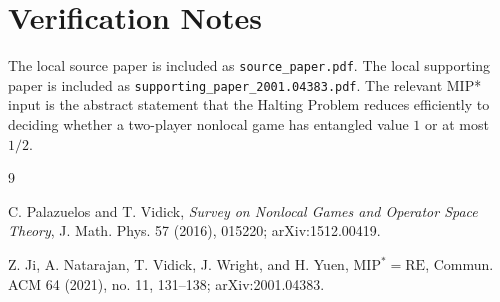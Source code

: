 \documentclass[11pt]{article}
\begin{document}
\section*{Verification Notes}

The local source paper is included as \texttt{source\_paper.pdf}.  The local
supporting paper is included as \texttt{supporting\_paper\_2001.04383.pdf}.
The relevant MIP* input is the abstract statement that the Halting Problem
reduces efficiently to deciding whether a two-player nonlocal game has
entangled value \(1\) or at most \(1/2\).

\begin{thebibliography}{9}

C. Palazuelos and T. Vidick,
\emph{Survey on Nonlocal Games and Operator Space Theory},
J. Math. Phys. 57 (2016), 015220;
arXiv:1512.00419.

Z. Ji, A. Natarajan, T. Vidick, J. Wright, and H. Yuen,
\emph{\( \mathrm{MIP}^{*}=\mathrm{RE} \)},
Commun. ACM 64 (2021), no. 11, 131--138;
arXiv:2001.04383.

\end{thebibliography}
\end{document}
